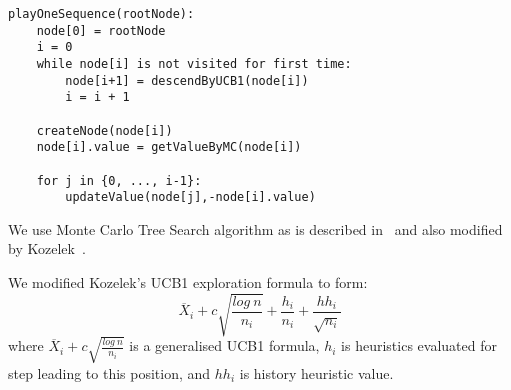 \lstset{language=Python, caption=Pseudocode of the MonteCarlo Tree Search, label=mcts:alg}
\begin{lstlisting}
playOneSequence(rootNode):
    node[0] = rootNode
    i = 0
    while node[i] is not visited for first time:
        node[i+1] = descendByUCB1(node[i])
        i = i + 1

    createNode(node[i])
    node[i].value = getValueByMC(node[i])

    for j in {0, ..., i-1}:
        updateValue(node[j],-node[i].value)
\end{lstlisting}

We use Monte Carlo Tree Search algorithm as is described in~\cite{MoGo} and also
modified by Kozelek~\cite{KOZELEK}.

We modified Kozelek's UCB1 exploration formula to form:
	$$
	\overline X_i + c \sqrt{\frac{log~n}{n_i}} + \frac{h_i}{n_i} + \frac{hh_i}{\sqrt{n_i}}
	$$
where $\overline X_i + c \sqrt{\frac{log~n}{n_i}}$ is a generalised UCB1
formula, $h_i$ is heuristics evaluated for step leading to this position, and
$hh_i$ is history heuristic value.
